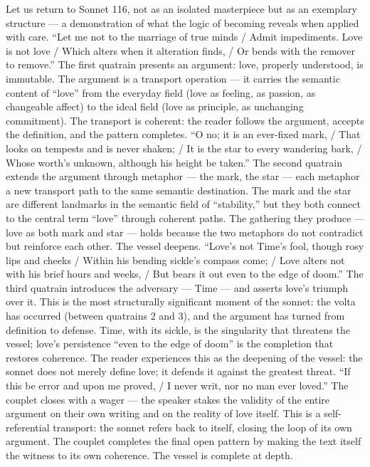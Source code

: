 Let us return to Sonnet 116, not as an isolated masterpiece but as an exemplary structure — a demonstration of what the logic of becoming reveals when applied with care. “Let me not to the marriage of true minds / Admit impediments. Love is not love / Which alters when it alteration finds, / Or bends with the remover to remove.” The first quatrain presents an argument: love, properly understood, is immutable. The argument is a transport operation — it carries the semantic content of “love” from the everyday field (love as feeling, as passion, as changeable affect) to the ideal field (love as principle, as unchanging commitment). The transport is coherent: the reader follows the argument, accepts the definition, and the pattern completes. “O no; it is an ever-fixed mark, / That looks on tempests and is never shaken; / It is the star to every wandering bark, / Whose worth’s unknown, although his height be taken.” The second quatrain extends the argument through metaphor — the mark, the star — each metaphor a new transport path to the same semantic destination. The mark and the star are different landmarks in the semantic field of “stability,” but they both connect to the central term “love” through coherent paths. The gathering they produce — love as both mark and star — holds because the two metaphors do not contradict but reinforce each other. The vessel deepens. “Love’s not Time’s fool, though rosy lips and cheeks / Within his bending sickle’s compass come; / Love alters not with his brief hours and weeks, / But bears it out even to the edge of doom.” The third quatrain introduces the adversary — Time — and asserts love’s triumph over it. This is the most structurally significant moment of the sonnet: the volta has occurred (between quatrains 2 and 3), and the argument has turned from definition to defense. Time, with its sickle, is the singularity that threatens the vessel; love’s persistence “even to the edge of doom” is the completion that restores coherence. The reader experiences this as the deepening of the vessel: the sonnet does not merely define love; it defends it against the greatest threat. “If this be error and upon me proved, / I never writ, nor no man ever loved.” The couplet closes with a wager — the speaker stakes the validity of the entire argument on their own writing and on the reality of love itself. This is a self-referential transport: the sonnet refers back to itself, closing the loop of its own argument. The couplet completes the final open pattern by making the text itself the witness to its own coherence. The vessel is complete at depth.

